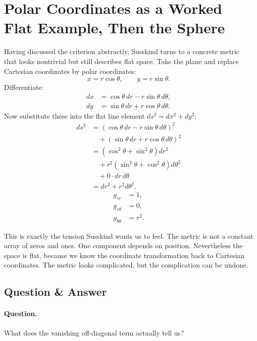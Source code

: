 \section{Polar Coordinates as a Worked Flat Example, Then the Sphere}

Having discussed the criterion abstractly, Susskind turns to a concrete metric that looks nontrivial but still describes flat space. Take the plane and replace Cartesian coordinates by polar coordinates:
\begin{equation}
x=r\cos\theta,
\qquad
y=r\sin\theta.
\end{equation}
Differentiate:
\begin{align}
dx &= \cos\theta\,dr-r\sin\theta\,d\theta, \\
dy &= \sin\theta\,dr+r\cos\theta\,d\theta.
\end{align}
Now substitute these into the flat line element \(ds^{2}=dx^{2}+dy^{2}\):
\begin{align}
ds^{2}
&=
\left(\cos\theta\,dr-r\sin\theta\,d\theta\right)^{2} \\
&\quad
+ \left(\sin\theta\,dr+r\cos\theta\,d\theta\right)^{2} \\
&=
\left(\cos^{2}\theta+\sin^{2}\theta\right)dr^{2}
\\
&\quad
+ r^{2}\left(\sin^{2}\theta+\cos^{2}\theta\right)d\theta^{2}
\\
&\quad
+ 0\cdot dr\,d\theta \\
&=
dr^{2}+r^{2}d\theta^{2}.
\end{align}
\begin{equation}
\begin{aligned}
g_{rr}&=1,\\
g_{r\theta}&=0,\\
g_{\theta\theta}&=r^{2}.
\end{aligned}
\end{equation}

This is exactly the tension Susskind wants us to feel. The metric is not a constant array of zeros and ones. One component depends on position. Nevertheless the space is flat, because we know the coordinate transformation back to Cartesian coordinates. The metric looks complicated, but the complication can be undone.

\subsection{Question \& Answer}

\paragraph{Question.} What does the vanishing off-diagonal term actually tell us?

